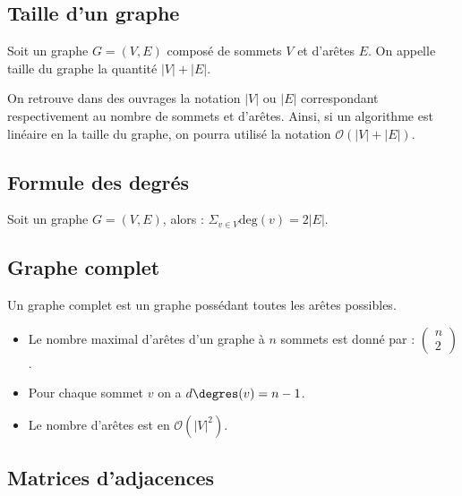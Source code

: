 \subsection{Taille d'un graphe}

\begin{defi}
Soit un graphe $G=\left(V,E\right)$ composé de sommets $V$ et d'arêtes $E$. On appelle taille du graphe la quantité $|V|+|E|$.
\end{defi}

\begin{rem}
On retrouve dans des ouvrages la notation $|V|$ ou $|E|$ correspondant respectivement au nombre de sommets et d'arêtes. 
Ainsi, si un algorithme est linéaire en la taille du graphe, on pourra utilisé la notation $\mathcal{O}\left(|V|+|E|\right)$.
\end{rem}

\subsection{Formule des degrés}
\begin{defi}
Soit un graphe $G=\left(V,E\right)$, alors : $\displaystyle{\Sigma_{v \in V}} \text{deg}(v) = 2|E|$.
\end{defi}

\subsection{Graphe complet}

\begin{defi}
Un graphe complet est un graphe possédant toutes les arêtes possibles. 
\end{defi}

\begin{rem}
\begin{itemize}
\item Le nombre maximal d'arêtes d'un graphe à $n$ sommets est donné par : $\begin{pmatrix} n \\ 2\end{pmatrix}$.
\item Pour chaque sommet $v$ on a $d\degres (v) = n-1$.
\item Le nombre d'arêtes est en $\mathcal{O}\left(|V|^2\right)$.
\end{itemize}
\end{rem}

\subsection{Matrices d'adjacences}


